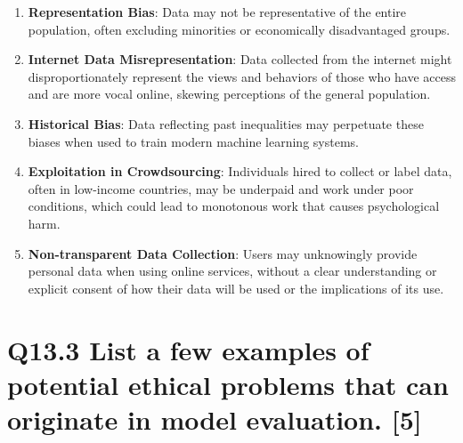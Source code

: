 \documentclass[11pt]{article}
\begin{document}
\begin{enumerate}
    \item \textbf{Representation Bias}: Data may not be representative of the entire population, often excluding minorities or economically disadvantaged groups.
    \item \textbf{Internet Data Misrepresentation}: Data collected from the internet might disproportionately represent the views and behaviors of those who have access and are more vocal online, skewing perceptions of the general population.
    \item \textbf{Historical Bias}: Data reflecting past inequalities may perpetuate these biases when used to train modern machine learning systems.
    \item \textbf{Exploitation in Crowdsourcing}: Individuals hired to collect or label data, often in low-income countries, may be underpaid and work under poor conditions, which could lead to monotonous work that causes psychological harm.
    \item \textbf{Non-transparent Data Collection}: Users may unknowingly provide personal data when using online services, without a clear understanding or explicit consent of how their data will be used or the implications of its use.
  \end{enumerate}
  
\section{Q13.3 List a few examples of potential ethical problems that can originate in model evaluation. [5]}
\end{document}
